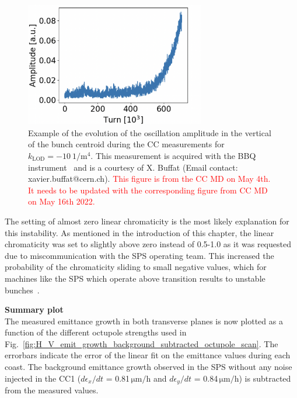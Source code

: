 \begin{figure}[!h]
   \centering         
   \includegraphics[width=0.7\textwidth]{images/Ch8/instability_klod-15_cc_md_4may2022.png}
       \caption{Example of the evolution of the oscillation amplitude in the vertical of the bunch centroid during the CC measurements for $k_\mathrm{LOD}=-10 \ \mathrm{1/m^4}$. This measurement is acquired with the BBQ instrument~\cite{Boccardi:1055568} and is a courtesy of X. Buffat (Email contact: xavier.buffat@cern.ch). \textcolor{red}{This figure is from the CC MD on May 4th. It needs to be updated with the corresponding figure from CC MD on May 16th 2022.} }
       \label{fig:instability_BBQ_klod-15_4may2022}
\end{figure}


The setting of almost zero linear chromaticity is the most likely explanation for this instability. As mentioned in the introduction of this chapter, the linear chromaticity was set to slightly above zero instead of 0.5-1.0 as it was requested due to miscommunication with the SPS operating team. This increased the probability of the chromaticity sliding to small negative values, which for machines like the SPS which operate above transition results to unstable bunches~\cite{collective_effects_cas_li}.

\textbf{Summary plot}\\
The measured emittance growth in both transverse planes is now plotted as a function of the different octupole strengths used in Fig.~\ref{fig:H_V_emit_growth_background_subtracted_octupole_scan}. The errorbars indicate the error of the linear fit on the emittance values during each coast. The background emittance growth observed in the SPS without any noise injected in the CC1 ($d\epsilon_x/dt$ = 0.81\,$\mathrm{\mu m/h}$ and $d\epsilon_y/dt$ = 0.84\,$\mathrm{\mu m/h}$) is subtracted from the measured values. 

